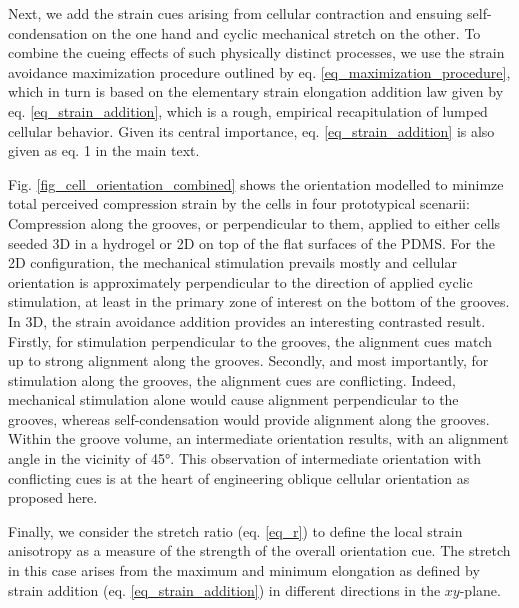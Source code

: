 \documentclass[11pt]{amsart}
\begin{document}
Next, we add the strain cues arising from cellular contraction and ensuing self-condensation on the one hand and cyclic mechanical stretch on the other. To combine the cueing effects of such physically distinct processes, we use the strain avoidance maximization procedure outlined by eq. \ref{eq_maximization_procedure}, which in turn is based on the elementary strain elongation addition law given by eq. \ref{eq_strain_addition}, which is a rough, empirical recapitulation of lumped cellular behavior. Given its central importance, eq. \ref{eq_strain_addition} is also given as eq. 1 in the main text.

Fig. \ref{fig_cell_orientation_combined} shows the orientation modelled to minimze total perceived compression strain by the cells in four prototypical scenarii: Compression along the grooves, or perpendicular to them, applied to either cells seeded 3D in a hydrogel or 2D on top of the flat surfaces of the PDMS. For the 2D configuration, the mechanical stimulation prevails mostly and cellular orientation is approximately perpendicular to the direction of applied cyclic stimulation, at least in the primary zone of interest on the bottom of the grooves. In 3D, the strain avoidance addition provides an interesting contrasted result.  Firstly, for stimulation perpendicular to the grooves, the alignment cues match up to strong alignment along the grooves. Secondly, and most importantly, for stimulation along the grooves, the alignment cues are conflicting. Indeed, mechanical stimulation alone would cause alignment perpendicular to the grooves, whereas self-condensation would provide alignment along the grooves. Within the groove volume, an intermediate orientation results, with an alignment angle in the vicinity of 45°. This observation of intermediate orientation with conflicting cues is at the heart of engineering oblique cellular orientation as proposed here.

Finally, we consider the stretch ratio (eq. \ref{eq_r}) to define the local strain anisotropy as a measure of the strength of the overall orientation cue. The stretch in this case arises from the maximum and minimum elongation as defined by strain addition (eq. \ref{eq_strain_addition}) in different directions in the $xy$-plane.  
\end{document}
